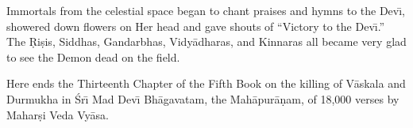 Immortals from the celestial space began to chant praises and hymns to the Dev\={\i}, showered down flowers on Her head and gave shouts of ``Victory to the Dev\={\i}.'' The \d{R}i\d{s}is, Siddhas, Gandarbhas, Vidy\=adharas, and Kinnaras all became very glad to see the Demon dead on the field.

Here ends the Thirteenth Chapter of the Fifth Book on the killing of V\=askala and Durmukha in \'Sr\={\i} Mad Dev\={\i} Bh\=agavatam, the Mah\=apur\=a\d{n}am, of 18,000 verses by Mahar\d{s}i Veda Vy\=asa.



